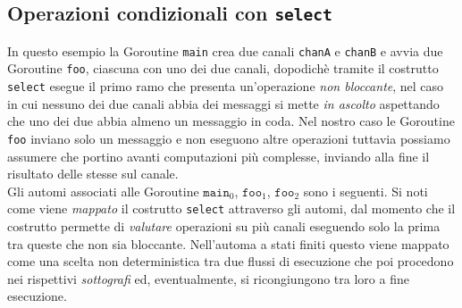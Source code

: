 \begin{figure}[h!]
    \centering
\end{figure}


\subsection{Operazioni condizionali con \texttt{select}}
In questo esempio la Goroutine \texttt{main} crea due canali \texttt{chanA} e \texttt{chanB} e avvia due Goroutine \texttt{foo}, ciascuna con uno dei due canali, dopodichè tramite il costrutto \texttt{select} esegue il primo ramo che presenta un'operazione \emph{non bloccante}, nel caso in cui nessuno dei due canali abbia dei messaggi si mette \emph{in ascolto} aspettando che uno dei due abbia almeno un messaggio in coda. Nel nostro caso le Goroutine \texttt{foo} inviano solo un messaggio e non eseguono altre operazioni tuttavia possiamo assumere che portino avanti computazioni più complesse, inviando alla fine il risultato delle stesse sul canale.\\

Gli automi associati alle Goroutine $\texttt{main}_0$, $\texttt{foo}_1$, $\texttt{foo}_2$ sono i seguenti. Si noti come viene \emph{mappato} il costrutto \texttt{select} attraverso gli automi, dal momento che il costrutto permette di \emph{valutare} operazioni su più canali eseguendo solo la prima tra queste che non sia bloccante. Nell'automa a stati finiti questo viene mappato come una scelta non deterministica tra due flussi di esecuzione che poi procedono nei rispettivi \emph{sottografi} ed, eventualmente, si ricongiungono tra loro a fine esecuzione.\bigskip \\
